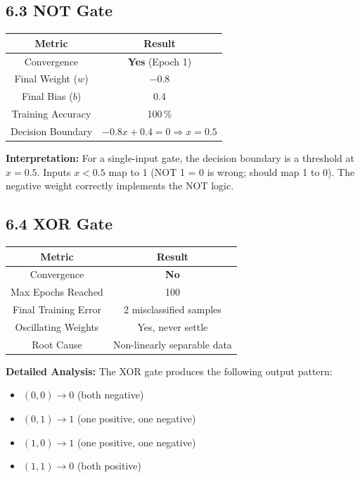 \documentclass[11pt]{article}
\begin{document}
\subsection*{6.3 NOT Gate}
\begin{center}
\begin{tabular}{|c|c|}
\hline
\textbf{Metric} & \textbf{Result}\\ \hline
Convergence & \textbf{Yes} (Epoch 1)\\ \hline
Final Weight ($w$) & $-0.8$\\ \hline
Final Bias ($b$) & 0.4\\ \hline
Training Accuracy & 100\,\%\\ \hline
Decision Boundary & $-0.8 x + 0.4 = 0 \Rightarrow x = 0.5$\\ \hline
\end{tabular}
\end{center}
\textbf{Interpretation:} For a single-input gate, the decision boundary is a threshold at $x=0.5$. Inputs $x < 0.5$ map to 1 (NOT 1 = 0 is wrong; should map 1 to 0). The negative weight correctly implements the NOT logic.

\subsection*{6.4 XOR Gate}
\begin{center}
\begin{tabular}{|c|c|}
\hline
\textbf{Metric} & \textbf{Result}\\ \hline
Convergence & \textbf{No}\\ \hline
Max Epochs Reached & 100\\ \hline
Final Training Error & 2 misclassified samples\\ \hline
Oscillating Weights & Yes, never settle\\ \hline
Root Cause & Non-linearly separable data\\ \hline
\end{tabular}
\end{center}
\textbf{Detailed Analysis:} The XOR gate produces the following output pattern:
\begin{itemize}
\item $(0,0) \to 0$ (both negative)
\item $(0,1) \to 1$ (one positive, one negative)
\item $(1,0) \to 1$ (one positive, one negative)
\item $(1,1) \to 0$ (both positive)
\end{itemize}
\end{document}
